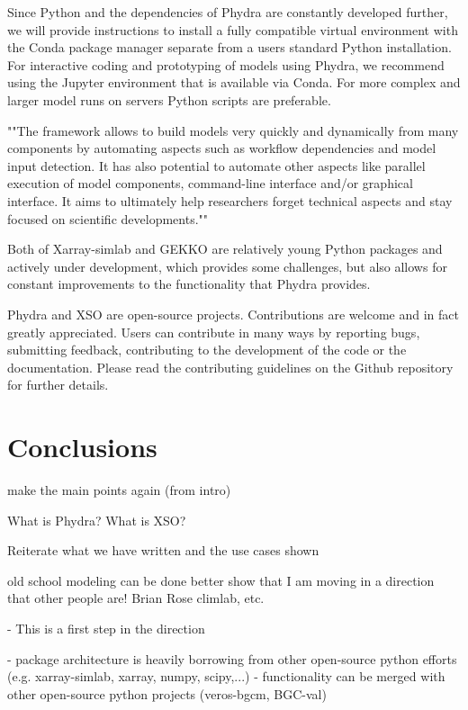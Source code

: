 \documentclass[journal abbreviation, manuscript]{copernicus}
\begin{document}
Since Python and the dependencies of Phydra are constantly developed further, we will provide instructions to install a fully compatible virtual environment with the Conda package manager separate from a users standard Python installation. For interactive coding and prototyping of models using Phydra, we recommend using the Jupyter environment that is available via Conda. For more complex and larger model runs on servers Python scripts are preferable.


""The framework allows to build models very quickly and dynamically from many components by automating aspects such as workflow dependencies and model input detection. It has also potential to automate other aspects like parallel execution of model components, command-line interface and/or graphical interface. It aims to ultimately help researchers forget technical aspects and stay focused on scientific developments.""

Both of Xarray-simlab and GEKKO are relatively young  Python packages and actively under development, which provides some challenges, but also allows for constant improvements to the functionality that Phydra provides.

Phydra and XSO are open-source projects. Contributions are welcome and in fact greatly appreciated. Users can contribute in many ways by reporting bugs, submitting feedback, contributing to the development of the code or the documentation. Please read the contributing guidelines on the Github repository for further details.


\section{Conclusions}

make the main points again (from intro)


What is Phydra? What is XSO?


Reiterate what we have written and the use cases shown


old school modeling can be done better
show that I am moving in a direction that other people are! Brian Rose climlab, etc.

- This is a first step in the direction

- package architecture is heavily borrowing from other open-source python efforts (e.g. xarray-simlab, xarray, numpy, scipy,...) 
- functionality can be merged with other open-source python projects (veros-bgcm, BGC-val)
\end{document}

